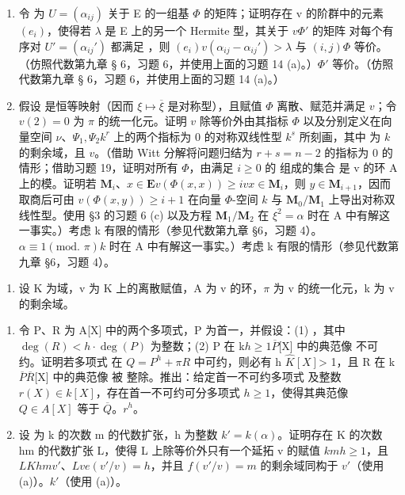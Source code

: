 \begin{enumerate}
\def\labelenumi{(\alph{enumi})}
\item
  令  为 \(U = (\alpha_{ij})\) 关于 E 的一组基 \(\Phi\) 的矩阵；证明存在 v 的阶群中的元素 \((e_i)\)，使得若 \(\lambda\) 是 E 上的另一个 Hermite 型，其关于 \(v\)\(\Phi'\) 的矩阵  对每个有序对 \(U' = (\alpha_{ij}')\) 都满足 ，则 \((e_i)\)\(v(\alpha_{ij} - \alpha_{ij}') > \lambda\) 与 \((i,j)\)\(\Phi\) 等价。（仿照代数第九章 § 6，习题 6，并使用上面的习题 14 (a)。）\(\Phi'\) 等价。（仿照代数第九章 § 6，习题 6，并使用上面的习题 14 (a)。）
\item
  假设  是恒等映射（因而 \(\xi \mapsto \overline{\xi}\) 是对称型），且赋值 \(\Phi\) 离散、赋范并满足 \(v\)；令 \(v(2) = 0\) 为 \(\pi\) 的统一化元。证明 \(v\) 除等价外由其指标 \(\Phi\) 以及分别定义在向量空间 \(\nu\)、\(\Psi_1, \Psi_2\)\(k^r\) 上的两个指标为 0 的对称双线性型 \(k^s\) 所刻画，其中  为 \(k\) 的剩余域，且 \(v\)。（借助 Witt 分解将问题归结为 \(r + s = n - 2\) 的指标为 0 的情形；借助习题 19，证明对所有 \(\Phi\)，由满足 \(i \geqslant 0\) 的  组成的集合  是 v 的环 A 上的模。证明若 \(\mathbf{M}_i\)、\(x \in \mathbf{E}\)\(v(\Phi(x, x)) \geqslant i\)\(v\)\(x \in \mathbf{M}_i\)，则 \(y \in \mathbf{M}_{i+1}\)，因而取商后可由 \(v(\Phi(x, y)) \geqslant i + 1\) 在向量 \(\Phi\)-空间 \(k\) 与 \(\mathbf{M}_0 / \mathbf{M}_1\) 上导出对称双线性型。使用 §3 的习题 6 (c) 以及方程 \(\mathbf{M}_1 / \mathbf{M}_2\) 在 \(\xi^2 = \alpha\) 时在 A 中有解这一事实。）考虑 k 有限的情形（参见代数第九章 §6，习题 4）。\(\alpha \equiv 1 (\text{mod. } \pi)\)\(k\) 时在 A 中有解这一事实。）考虑 k 有限的情形（参见代数第九章 §6，习题 4）。
\end{enumerate}

\begin{enumerate}
\def\labelenumi{\arabic{enumi}.}
\setcounter{enumi}{20}
\tightlist
\item
  设 K 为域，v 为 K 上的离散赋值，A 为 v 的环，\(\pi\) 为 v 的统一化元，k 为 v 的剩余域。
\end{enumerate}

\begin{enumerate}
\def\labelenumi{(\alph{enumi})}
\item
  令 P、R 为 A{[}X{]} 中的两个多项式，P 为首一，并假设：(1) ，其中 \(\deg(R) < h \cdot \deg(P)\) 为整数；(2) P 在 k\(h \geqslant 1\)\(\overline{P}\){[}X{]} 中的典范像  不可约。证明若多项式  在 \(Q = P^{h} + \pi R\) 中可约，则必有 h \(\widehat{K}[X]\)\textgreater{} 1，且 R 在 k\(\overline{P}\)\(\overline{R}\){[}X{]} 中的典范像  被  整除。推出：给定首一不可约多项式  及整数 \(r(X) \in k[X]\)，存在首一不可约可分多项式 \(h \geqslant 1\)，使得其典范像 \(Q \in A[X]\) 等于 \(\overline{Q}\)。\(r^{h}\)。
\item
  设  为 k 的次数 m 的代数扩张，h 为整数 \(k' = k(\alpha)\)。证明存在 K 的次数 hm 的代数扩张 L，使得 L 上除等价外只有一个延拓 v 的赋值 \(k\)\(m\)\(h\)\(\geqslant 1\)，且 \(L\)\(K\)\(hm\)\(v'\)、\(L\)\(v\)\(e(v'/v) = h\)，并且 \(f(v'/v) = m\) 的剩余域同构于 \(v'\)（使用 (a)）。\(k'\)（使用 (a)）。
\end{enumerate}


